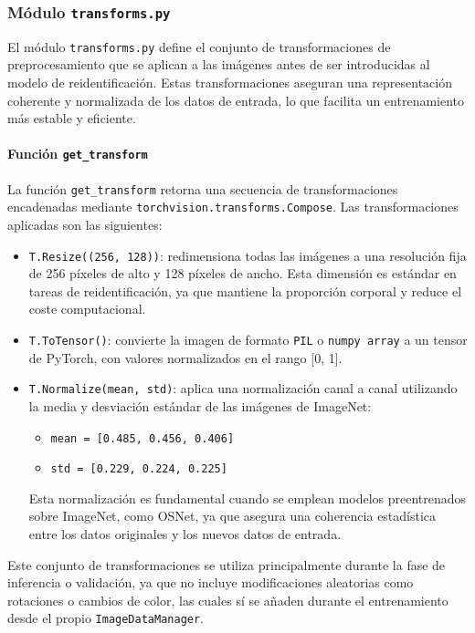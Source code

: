 \documentclass[12pt, a4paper, twoside]{article}
\begin{document}
	
	\subsubsection{Módulo \texttt{transforms.py}}
	
	El módulo \texttt{transforms.py} define el conjunto de transformaciones de preprocesamiento que se aplican a las imágenes antes de ser introducidas al modelo de reidentificación. Estas transformaciones aseguran una representación coherente y normalizada de los datos de entrada, lo que facilita un entrenamiento más estable y eficiente.
	
	\paragraph{Función \texttt{get\_transform}}
	
	La función \texttt{get\_transform} retorna una secuencia de transformaciones encadenadas mediante \texttt{torchvision.transforms.Compose}. Las transformaciones aplicadas son las siguientes:
	
	\begin{itemize}
		\item \texttt{T.Resize((256, 128))}: redimensiona todas las imágenes a una resolución fija de 256 píxeles de alto y 128 píxeles de ancho. Esta dimensión es estándar en tareas de reidentificación, ya que mantiene la proporción corporal y reduce el coste computacional.
		
		\item \texttt{T.ToTensor()}: convierte la imagen de formato \texttt{PIL} o \texttt{numpy array} a un tensor de PyTorch, con valores normalizados en el rango [0, 1].
		
		\item \texttt{T.Normalize(mean, std)}: aplica una normalización canal a canal utilizando la media y desviación estándar de las imágenes de ImageNet:
		\begin{itemize}
			\item \texttt{mean = [0.485, 0.456, 0.406]}
			\item \texttt{std = [0.229, 0.224, 0.225]}
		\end{itemize}
		Esta normalización es fundamental cuando se emplean modelos preentrenados sobre ImageNet, como OSNet, ya que asegura una coherencia estadística entre los datos originales y los nuevos datos de entrada.
	\end{itemize}
	
	Este conjunto de transformaciones se utiliza principalmente durante la fase de inferencia o validación, ya que no incluye modificaciones aleatorias como rotaciones o cambios de color, las cuales sí se añaden durante el entrenamiento desde el propio \texttt{ImageDataManager}.
	
\end{document}
